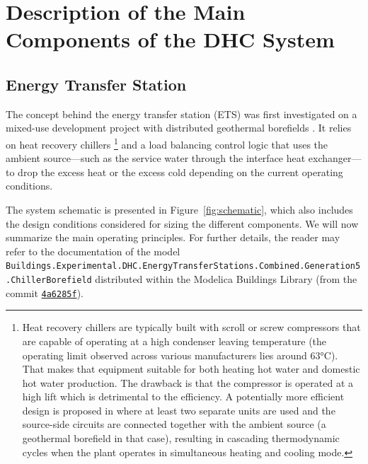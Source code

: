 \section{Description of the Main Components of the DHC System} \label{sec:components}

\subsection{Energy Transfer Station} \label{sec:ets}

The concept behind the energy transfer station (ETS) was first investigated on a mixed-use development project with distributed geothermal borefields \citep{WetterHu2019}.
It relies on heat recovery chillers%
\footnote{Heat recovery chillers are typically built with scroll or screw compressors that are capable of operating at a high condenser leaving temperature (the operating limit observed across various manufacturers lies around 63°C). That makes that equipment suitable for both heating hot water and domestic hot water production. The drawback is that the compressor is operated at a high lift which is detrimental to the efficiency. A potentially more efficient design is proposed in \cite{Cline2020} where at least two separate units are used and the source-side circuits are connected together with the ambient source (a geothermal borefield in that case), resulting in cascading thermodynamic cycles when the plant operates in simultaneous heating and cooling mode.}
and a load balancing control logic that uses the ambient source---such as the service water through the interface heat exchanger---to drop the excess heat or the excess cold depending on the current operating conditions.

The system schematic is presented in Figure~\ref{fig:schematic}, which also includes the design conditions considered for sizing the different components.
We will now summarize the main operating principles. For further details, the reader may refer to the documentation of the model \lstinline|Buildings.Experimental.DHC.EnergyTransferStations.Combined.Generation5.ChillerBorefield| distributed within the Modelica Buildings Library (from the commit \href{https://github.com/lbl-srg/modelica-buildings/tree/4a6285f}{\lstinline|4a6285f|}).

